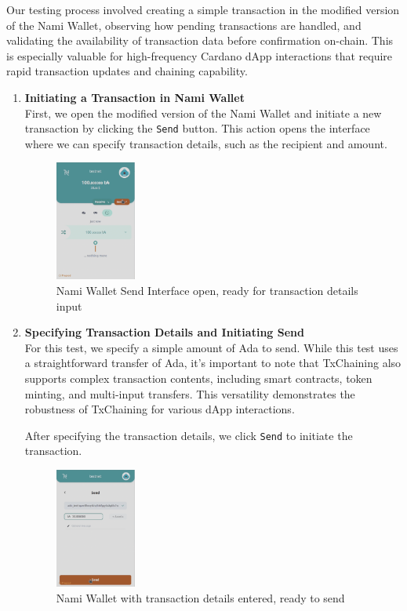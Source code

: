 \documentclass[11pt]{article}
\begin{document}
Our testing process involved creating a simple transaction in the modified version of the Nami Wallet, observing how pending transactions are handled, and validating the availability of transaction data before confirmation on-chain. This is especially valuable for high-frequency Cardano dApp interactions that require rapid transaction updates and chaining capability.

\begin{enumerate}
    \item \textbf{Initiating a Transaction in Nami Wallet}\\
    First, we open the modified version of the Nami Wallet and initiate a new transaction by clicking the \texttt{Send} button. This action opens the interface where we can specify transaction details, such as the recipient and amount. 
    \newline
    \begin{figure}[ht]
        \centering
        \includegraphics[width=100px]{./imgs/fe1}
        \caption{Nami Wallet Send Interface open, ready for transaction details input}
    \end{figure}
    
    \item \textbf{Specifying Transaction Details and Initiating Send}\\
    For this test, we specify a simple amount of Ada to send. While this test uses a straightforward transfer of Ada, it’s important to note that TxChaining also supports complex transaction contents, including smart contracts, token minting, and multi-input transfers. This versatility demonstrates the robustness of TxChaining for various dApp interactions.
    
    After specifying the transaction details, we click \texttt{Send} to initiate the transaction.
    \newline
    \begin{figure}[ht]
        \centering
        \includegraphics[width=100px]{./imgs/fe2}
        \caption{Nami Wallet with transaction details entered, ready to send}
    \end{figure}
    

\end{enumerate}
\end{document}
